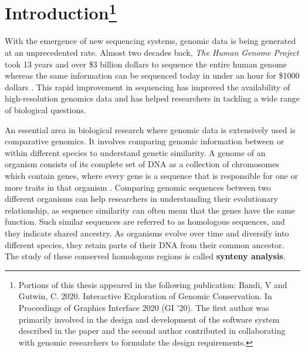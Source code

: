 \chapter[Introduction]{Introduction\footnote{Portions of this thesis appeared in the following publication: Bandi, V and Gutwin, C. 2020. Interactive Exploration of Genomic Conservation. In Proceedings of Graphics Interface 2020 (GI ’20). The first author was primarily involved in the design and development of the software system described in the paper and the second author contributed in collaborating with genomic researchers to formulate the design requirements.}}

With the emergence of new sequencing systems, genomic data is being generated at an unprecedented rate. Almost two decades back, \textit{The Human Genome Project} took 13 years and over \$3 billion dollars to sequence the entire human genome whereas the same information can be sequenced today in under an hour for \$1000 dollars \cite{genomegovHGP}. This rapid improvement in sequencing has improved the availability of high-resolution genomics data and has helped researchers in tackling a wide range of biological questions\cite{nielsen2010visualizing}.

An essential area in biological research where genomic data is extensively used is comparative genomics. It involves comparing genomic information between or within different species to understand genetic similarity. A genome of an organism consists of its complete set of DNA as a collection of chromosomes which contain genes, where every gene is a sequence that is responsible for one or more traits in that organism \cite{hartwell2008genetics}. Comparing genomic sequences between two different organisms can help researchers in understanding their evolutionary relationship, as sequence similarity can often mean that the genes have the same function. Such similar sequences are referred to as homologous sequences, and they indicate shared ancestry. As organisms evolve over time and diversify into different species, they retain parts of their DNA from their common ancestor. The study of these conserved homologous regions is called \textbf{synteny analysis}. 


